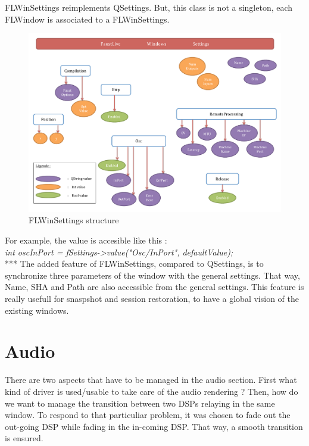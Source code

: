 \documentclass[a4paper]{article}
\begin{document}
{FLWinSettings reimplements QSettings. But, this class is not a singleton, each FLWindow is associated to a FLWinSettings. 

\begin{figure}[!h]
\begin{center}
\includegraphics[width=\columnwidth]{images/FLWinSettings}
\caption{FLWinSettings structure}
\label{fig:FLWinSettings}
\end{center}
\end{figure}


For example, the value is accesible like this :\\
\textit{int oscInPort = fSettings->value("Osc/InPort", defaultValue);} \\

 *** The added feature of FLWinSettings, compared to QSettings, is to synchronize three parameters of the window with the general settings. That way, Name, SHA and Path are also accessible from the general settings. This feature is really usefull for snaspshot and session restoration, to have a global vision of the existing windows.

\section{Audio}

There are two aspects that have to be managed in the audio section. First what kind of driver is used/usable to take care of the audio rendering ? Then, how do we want to manage the transition between two DSPs relaying in the same window. To respond to that particuliar problem, it was chosen to fade out the out-going DSP while fading in the in-coming DSP. That way, a smooth transition is ensured. 

}
\end{document}
